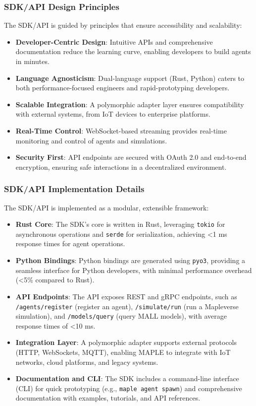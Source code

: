 \documentclass[a4paper,11pt]{article}
\begin{document}
\subsubsection{SDK/API Design Principles}
The SDK/API is guided by principles that ensure accessibility and scalability:
\begin{itemize}[leftmargin=*]
    \item \textbf{Developer-Centric Design}: Intuitive APIs and comprehensive documentation reduce the learning curve, enabling developers to build agents in minutes.
    \item \textbf{Language Agnosticism}: Dual-language support (Rust, Python) caters to both performance-focused engineers and rapid-prototyping developers.
    \item \textbf{Scalable Integration}: A polymorphic adapter layer ensures compatibility with external systems, from IoT devices to enterprise platforms.
    \item \textbf{Real-Time Control}: WebSocket-based streaming provides real-time monitoring and control of agents and simulations.
    \item \textbf{Security First}: API endpoints are secured with OAuth 2.0 and end-to-end encryption, ensuring safe interactions in a decentralized environment.
\end{itemize}

\subsubsection{SDK/API Implementation Details}
The SDK/API is implemented as a modular, extensible framework:
\begin{itemize}[leftmargin=*]
    \item \textbf{Rust Core}: The SDK’s core is written in Rust, leveraging \texttt{tokio} for asynchronous operations and \texttt{serde} for serialization, achieving <1 ms response times for agent operations.
    \item \textbf{Python Bindings}: Python bindings are generated using \texttt{pyo3}, providing a seamless interface for Python developers, with minimal performance overhead (<5\% compared to Rust).
    \item \textbf{API Endpoints}: The API exposes REST and gRPC endpoints, such as \texttt{/agents/register} (register an agent), \texttt{/simulate/run} (run a Mapleverse simulation), and \texttt{/models/query} (query MALL models), with average response times of <10 ms.
    \item \textbf{Integration Layer}: A polymorphic adapter supports external protocols (HTTP, WebSockets, MQTT), enabling MAPLE to integrate with IoT networks, cloud platforms, and legacy systems.
    \item \textbf{Documentation and CLI}: The SDK includes a command-line interface (CLI) for quick prototyping (e.g., \texttt{maple agent spawn}) and comprehensive documentation with examples, tutorials, and API references.
\end{itemize}
\end{document}

